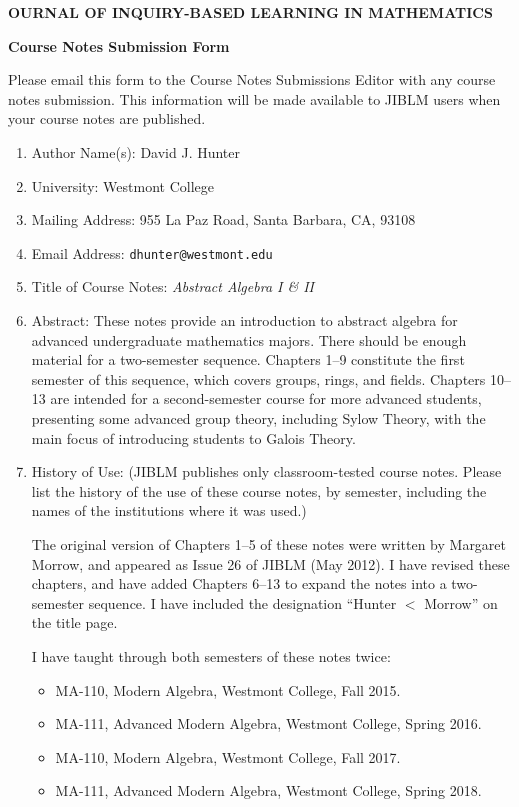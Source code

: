 \documentclass[12pt]{article}
\begin{document}
\begin{center}
{\bf {}OURNAL OF {\Large I}NQUIRY-{\Large B}ASED
{\Large L}EARNING
\medskip
\noindent IN {\Large M}ATHEMATICS}
\end{center}

\medskip
\begin{center}
{\large \bf Course Notes Submission Form}
\end{center}

Please email this form to the Course Notes Submissions Editor with any course notes submission. This information will be made available to JIBLM users when your course notes are published.

\begin{enumerate}

\item Author Name(s): David J. Hunter

\item University: Westmont College

\item Mailing Address: 955 La Paz Road, Santa Barbara, CA, 93108

\item Email Address: \texttt{dhunter@westmont.edu}

\item Title of Course Notes: \textit{Abstract Algebra I \& II}

\item Abstract: These notes provide an introduction to abstract algebra for advanced undergraduate mathematics majors. There should be enough material for a two-semester sequence. Chapters 1--9 constitute the first semester of this sequence, which covers groups, rings, and fields. Chapters 10--13 are intended for a second-semester course for more advanced students, presenting some advanced group theory, including Sylow Theory, with the main focus of introducing students to Galois Theory.

\item History of Use: (JIBLM publishes only classroom-tested course notes. Please list the history of the use of these course notes, by semester, including the names of the institutions where it was used.)

The original version of Chapters 1--5 of these notes were written by Margaret Morrow, and appeared as Issue 26 of JIBLM (May 2012). I have revised these chapters, and have added Chapters 6--13 to expand the notes into a two-semester sequence. I have included the designation ``Hunter $<$ Morrow'' on the title page.

I have taught through both semesters of these notes twice:

\begin{itemize}
    \item MA-110, Modern Algebra, Westmont College, Fall 2015.
    \item MA-111, Advanced Modern Algebra, Westmont College, Spring 2016.
    \item MA-110, Modern Algebra, Westmont College, Fall 2017.
    \item MA-111, Advanced Modern Algebra, Westmont College, Spring 2018.
\end{itemize}
\end{enumerate}
\end{document}
